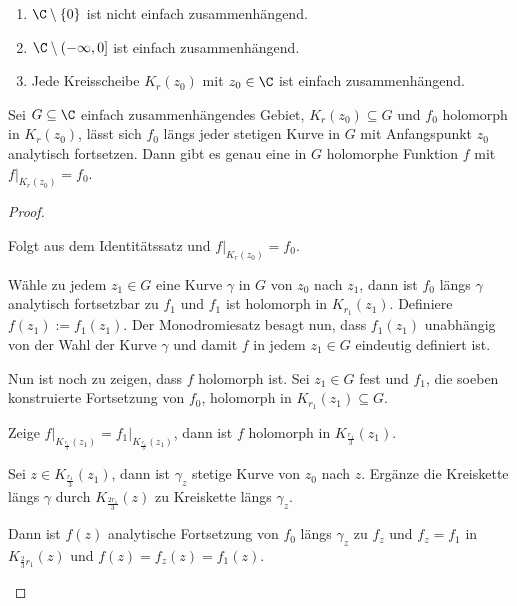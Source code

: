 \begin{bspn}
\begin{enumerate}
  \item $\C\setminus\{0\}$ ist nicht einfach zusammenhängend.
  \item $\C\setminus(-\infty,0]$ ist einfach zusammenhängend.
  \item Jede Kreisscheibe $K_r(z_0)$ mit $z_0\in\C$ ist
  einfach zusammenhängend.\bsphere
\end{enumerate}
\end{bspn}

\begin{cor}
\label{prop:2.75}
Sei $G\subseteq \C$ einfach zusammenhängendes Gebiet, $K_r(z_0)\subseteq G$ und
$f_0$ holomorph in $K_r(z_0)$, lässt sich $f_0$ längs jeder stetigen Kurve
in $G$ mit Anfangspunkt $z_0$ analytisch fortsetzen. Dann gibt es genau eine in
$G$ holomorphe Funktion $f$ mit $f\big|_{K_r(z_0)} = f_0$.\fishhere
\end{cor}
\begin{proof}
\begin{bemn}[Eindeutigkeit.]
Folgt aus dem Identitätssatz  und $f\big|_{K_r(z_0)} = f_0$.
\end{bemn}
\begin{bemn}[Existenz.]
Wähle zu jedem $z_1\in G$ eine Kurve $\gamma$ in $G$ von $z_0$ nach
$z_1$, dann ist $f_0$ längs $\gamma$ analytisch fortsetzbar zu $f_1$ und $f_1$
ist holomorph in $K_{r_1}(z_1)$. Definiere $f(z_1) := f_1(z_1)$. Der
Monodromiesatz besagt nun, dass $f_1(z_1)$ unabhängig von der Wahl der Kurve
$\gamma$ und damit $f$ in jedem $z_1\in G$ eindeutig definiert ist.

Nun ist noch zu zeigen, dass $f$ holomorph ist. Sei $z_1\in G$
fest und $f_1$, die soeben konstruierte Fortsetzung von $f_0$, holomorph in
$K_{r_1}(z_1)\subseteq G$.

Zeige $f\big|_{K_{\frac{r_1}{3}}(z_1)} = f_1\big|_{K_{\frac{r_1}{3}}(z_1)}$,
dann ist $f$ holomorph in $K_{\frac{r_1}{3}}(z_1)$.

Sei $z\in K_{\frac{r_1}{3}}(z_1)$, dann ist $\gamma_z$ stetige Kurve von $z_0$
nach $z$. Ergänze die Kreiskette längs $\gamma$ durch $K_{\frac{2r_1}{3}}(z)$
zu Kreiskette längs $\gamma_z$.

Dann ist $f(z)$ analytische Fortsetzung von $f_0$ längs $\gamma_z$ zu $f_z$ und
$f_z = f_1$ in $K_{\frac{2}{3}r_1}(z)$ und $f(z) = f_z(z) = f_1(z)$.\qedhere
\end{bemn}
\end{proof}

